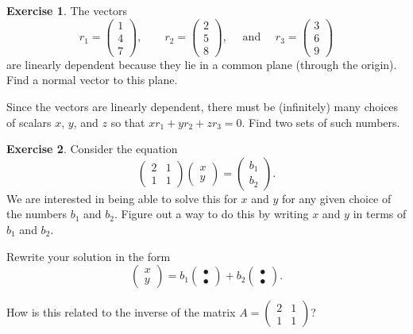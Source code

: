 \documentclass[11pt]{amsart}
\theoremstyle{definition}
\newtheorem{exercise}{Exercise}
\begin{document}
\vspace{1cm}

\begin{exercise}
The vectors
\[
r_1 = \begin{pmatrix} 1 \\ 4 \\ 7 \end{pmatrix}, \qquad
r_2 = \begin{pmatrix} 2 \\ 5 \\ 8 \end{pmatrix}, \quad \text{ and } \quad
r_3 = \begin{pmatrix} 3 \\ 6 \\ 9 \end{pmatrix}
\]
are linearly dependent because they lie in a common plane (through the origin). Find a normal vector to this plane.

Since the vectors are linearly dependent, there must be (infinitely) many choices of scalars $x$, $y$, and $z$ so that $x r_1 + y r_2 + z r_3 = 0$. Find two sets of such numbers.
\end{exercise}

\vspace{1cm}

\begin{exercise}
Consider the equation
\[
\begin{pmatrix} 2 & 1 \\ 1 & 1 \end{pmatrix}\begin{pmatrix} x \\ y \end{pmatrix} = \begin{pmatrix} b_1 \\ b_2 \end{pmatrix}.
\]
We are interested in being able to solve this for $x$ and $y$ for any given choice of the numbers $b_1$ and $b_2$. Figure out a way to do this by writing $x$ and $y$ in terms of $b_1$ and $b_2$.

Rewrite your solution in the form
\[
\begin{pmatrix} x \\ y \end{pmatrix} = b_1 \begin{pmatrix} \bullet \\ \bullet\end{pmatrix} + b_2 \begin{pmatrix}  \bullet \\ \bullet \end{pmatrix}.
\]

How is this related to the inverse of the matrix $A = \left( \begin{smallmatrix} 2 & 1 \\ 1 & 1 \end{smallmatrix} \right)$?
\end{exercise}
\end{document}
